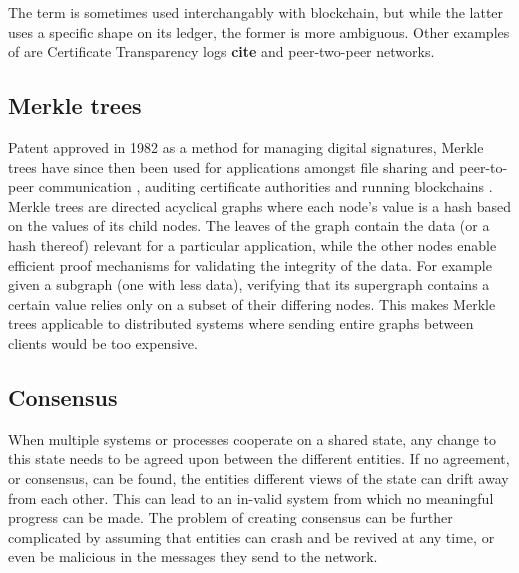 \documentclass[english, biblatex, digitaloutput]{kththesis}
\begin{document}
The term  is sometimes used interchangably with blockchain, but while the latter uses a specific shape on its ledger, the former is more ambiguous. Other examples of  are Certificate Transparency logs \textbf{cite} and peer-two-peer networks.

\subsection{Merkle trees}

Patent approved in 1982 \cite{merkle_method_1982} as a method for managing digital signatures, Merkle trees have since then been used for applications amongst file sharing and peer-to-peer communication \cite{daniel_ipfs_2022}, auditing certificate authorities \cite{laurie_certificate_2013} and running blockchains \cite{zahed_benisi_blockchain-based_2020}. Merkle trees are directed acyclical graphs where each node's value is a hash based on the values of its child nodes. The leaves of the graph contain the data (or a hash thereof) relevant for a particular application, while the other nodes enable efficient proof mechanisms for validating the integrity of the data. For example given a subgraph (\ie one with less data), verifying that its supergraph contains a certain value relies only on a subset of their differing nodes. This makes Merkle trees applicable to distributed systems where sending entire graphs between clients would be too expensive.

\subsection{Consensus}

When multiple systems or processes cooperate on a shared state, any change to this state needs to be agreed upon between the different entities. If no agreement, or consensus, can be found, the entities different views of the state can drift away from each other. This can lead to an in-valid system from which no meaningful progress can be made. The problem of creating consensus can be further complicated by assuming that entities can crash and be revived at any time, or even be malicious in the messages they send to the network.
\end{document}
